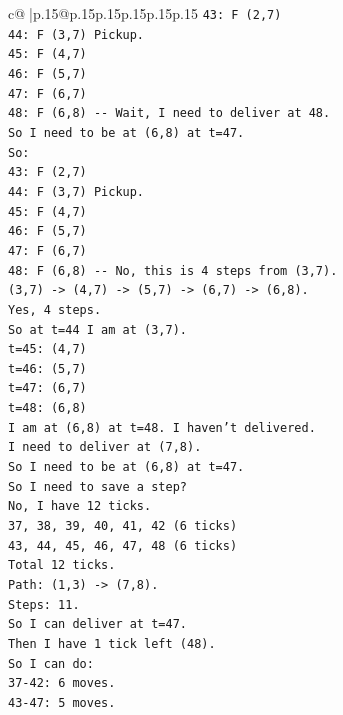 \documentclass{article}
\begin{document}
{\begin{supertabular}{c@{$\;$}|p{.15\linewidth}@{}p{.15\linewidth}p{.15\linewidth}p{.15\linewidth}p{.15\linewidth}p{.15\linewidth}}
{{{\texttt{43: F (2,7)} \\
\texttt{44: F (3,7) Pickup.} \\
\texttt{45: F (4,7)} \\
\texttt{46: F (5,7)} \\
\texttt{47: F (6,7)} \\
\texttt{48: F (6,8) {-}{-} Wait, I need to deliver at 48.} \\
\texttt{So I need to be at (6,8) at t=47.} \\
\texttt{So:} \\
\texttt{43: F (2,7)} \\
\texttt{44: F (3,7) Pickup.} \\
\texttt{45: F (4,7)} \\
\texttt{46: F (5,7)} \\
\texttt{47: F (6,7)} \\
\texttt{48: F (6,8) {-}{-} No, this is 4 steps from (3,7).} \\
\texttt{(3,7) {-}> (4,7) {-}> (5,7) {-}> (6,7) {-}> (6,8).} \\
\texttt{Yes, 4 steps.} \\
\texttt{So at t=44 I am at (3,7).} \\
\texttt{t=45: (4,7)} \\
\texttt{t=46: (5,7)} \\
\texttt{t=47: (6,7)} \\
\texttt{t=48: (6,8)} \\
\texttt{I am at (6,8) at t=48. I haven't delivered.} \\
\texttt{I need to deliver at (7,8).} \\
\texttt{So I need to be at (6,8) at t=47.} \\
\texttt{So I need to save a step?} \\
\texttt{No, I have 12 ticks.} \\
\texttt{37, 38, 39, 40, 41, 42 (6 ticks)} \\
\texttt{43, 44, 45, 46, 47, 48 (6 ticks)} \\
\texttt{Total 12 ticks.} \\
\texttt{Path: (1,3) {-}> (7,8).} \\
\texttt{Steps: 11.} \\
\texttt{So I can deliver at t=47.} \\
\texttt{Then I have 1 tick left (48).} \\
\texttt{So I can do:} \\
\texttt{37{-}42: 6 moves.} \\
\texttt{43{-}47: 5 moves.} \\
}}}
\end{supertabular}}
\end{document}
